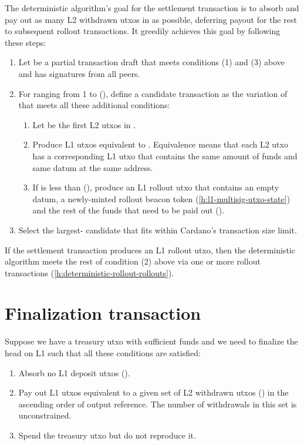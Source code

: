 \documentclass[../hydrozoa.tex]{subfiles}
\begin{document}
The deterministic algorithm's goal for the settlement transaction is to absorb  and pay out as many L2 withdrawn utxos in  as possible, deferring payout for the rest to subsequent rollout transactions.
It greedily achieves this goal by following these steps:
\begin{enumerate}
  \item Let  be a partial transaction draft that meets conditions (1) and (3) above and has signatures from all peers.
  \item For  ranging from 1 to (), define a candidate transaction as the variation of  that meets all these additional conditions:
    \begin{enumerate}
      \item Let  be the first  L2 utxos in .
      \item Produce L1 utxos equivalent to .
        Equivalence means that each L2 utxo has a corresponding L1 utxo that contains the same amount of funds and same datum at the same address.
      \item If  is less than (), produce an L1 rollout utxo that contains an empty datum, a newly-minted rollout beacon token (\cref{h:l1-multisig-utxo-state}) and the rest of the funds that need to be paid out
        ().
    \end{enumerate}
  \item Select the largest- candidate that fits within Cardano's transaction size limit.
\end{enumerate}

If the settlement transaction produces an L1 rollout utxo, then the deterministic algorithm meets the rest of condition (2) above via one or more rollout transactions (\cref{h:deterministic-rollout-rollouts}).

\section{Finalization transaction}%
\label{h:deterministic-rollout-finalization}%

Suppose we have a treasury utxo with sufficient funds and we need to finalize the head on L1 such that all these conditions are satisfied:
\begin{enumerate}
  \item Absorb no L1 deposit utxos ().
  \item Pay out L1 utxos equivalent to a given set of L2 withdrawn utxos () in the ascending order of output reference.
    The number of withdrawals in this set is unconstrained.
  \item Spend the treasury utxo but do not reproduce it.
\end{enumerate}
\end{document}
